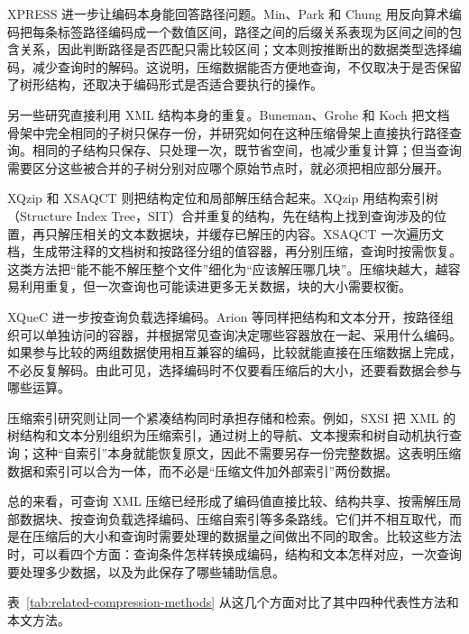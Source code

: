 XPRESS 进一步让编码本身能回答路径问题\cite{min2003xpress}。Min、Park 和 Chung 用反向算术编码把每条标签路径编码成一个数值区间，路径之间的后缀关系表现为区间之间的包含关系，因此判断路径是否匹配只需比较区间；文本则按推断出的数据类型选择编码，减少查询时的解码。这说明，压缩数据能否方便地查询，不仅取决于是否保留了树形结构，还取决于编码形式是否适合要执行的操作。

另一些研究直接利用 XML 结构本身的重复。Buneman、Grohe 和 Koch 把文档骨架中完全相同的子树只保存一份，并研究如何在这种压缩骨架上直接执行路径查询\cite{buneman2003path}。相同的子结构只保存、只处理一次，既节省空间，也减少重复计算；但当查询需要区分这些被合并的子树分别对应哪个原始节点时，就必须把相应部分展开。

XQzip 和 XSAQCT 则把结构定位和局部解压结合起来。XQzip 用结构索引树（Structure Index Tree，SIT）合并重复的结构，先在结构上找到查询涉及的位置，再只解压相关的文本数据块，并缓存已解压的内容\cite{cheng2004xqzip}。XSAQCT 一次遍历文档，生成带注释的文档树和按路径分组的值容器，再分别压缩，查询时按需恢复\cite{muldner2009xsaqct}。这类方法把“能不能不解压整个文件”细化为“应该解压哪几块”。压缩块越大，越容易利用重复，但一次查询也可能读进更多无关数据，块的大小需要权衡。

XQueC 进一步按查询负载选择编码\cite{arion2007xquec}。Arion 等同样把结构和文本分开，按路径组织可以单独访问的容器，并根据常见查询决定哪些容器放在一起、采用什么编码。如果参与比较的两组数据使用相互兼容的编码，比较就能直接在压缩数据上完成，不必反复解码。由此可见，选择编码时不仅要看压缩后的大小，还要看数据会参与哪些运算。

压缩索引研究则让同一个紧凑结构同时承担存储和检索。例如，SXSI 把 XML 的树结构和文本分别组织为压缩索引，通过树上的导航、文本搜索和树自动机执行查询；这种“自索引”本身就能恢复原文，因此不需要另存一份完整数据\cite{arroyuelo2015fast}。这表明压缩数据和索引可以合为一体，而不必是“压缩文件加外部索引”两份数据。

总的来看，可查询 XML 压缩已经形成了编码值直接比较、结构共享、按需解压局部数据块、按查询负载选择编码、压缩自索引等多条路线。它们并不相互取代，而是在压缩后的大小和查询时需要处理的数据量之间做出不同的取舍。比较这些方法时，可以看四个方面：查询条件怎样转换成编码，结构和文本怎样对应，一次查询要处理多少数据，以及为此保存了哪些辅助信息。

表~\ref{tab:related-compression-methods} 从这几个方面对比了其中四种代表性方法和本文方法。

